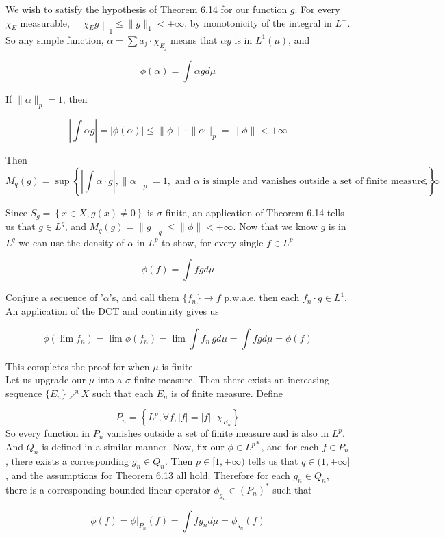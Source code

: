 \documentclass[../../main.tex]{subfiles}
\begin{document}
We wish to satisfy the hypothesis of Theorem 6.14 for our function $g$. For every $\chi_E$ measurable, $\left\lVert \chi_E g\right\rVert_1\leq \lVert g\rVert_1<+\infty$, by monotonicity of the integral in $L^+$. So any simple function, $\alpha = \sum a_j\cdot\chi_{E_j}$ means that $\alpha g$ is in $L^1(\mu)$, and

$$
\phi(\alpha) = \int \alpha g d\mu
$$

If $\lVert \alpha \rVert_p = 1$, then 

$$
\left|\int\alpha g\right| = \left|\phi(\alpha)\right| \leq \lVert \phi \rVert\cdot \lVert \alpha\rVert_p  = \lVert \phi \rVert < +\infty
$$

Then 
$$M_q(g) = \sup\left\{\left|\int \alpha\cdot g\right|, \lVert \alpha \rVert_p = 1, \text{ and $\alpha$ is simple and vanishes outside a set of finite measure.}\right\}<\infty$$

Since $S_g = \left\{x\in X, g(x) \neq 0\right\}$ is $\sigma$-finite, an application of Theorem 6.14 tells us that $g\in L^q$, and $M_q(g) = \lVert g \rVert_q\leq \lVert \phi \rVert<+\infty$. Now that we know $g$ is in $L^q$ we can use the density of $\alpha$ in $L^p$ to show, for every single $f\in L^p$

$$
\phi(f) = \int fg d\mu
$$

Conjure a sequence of '$\alpha$'s, and call them $\{f_n\} \to f$ p.w.a.e, then each $f_n\cdot g\in L^1$. An application of the DCT and continuity gives us

$$
\phi(\lim f_n) = \lim\phi(f_n) = \lim \int f_n\,gd\mu = \int fgd\mu=\phi(f)
$$

This completes the proof for when $\mu$ is finite.\\[2ex]

Let us upgrade our $\mu$ into a $\sigma$-finite measure. Then there exists an increasing sequence $\{E_n\}\nearrow X$ such that each $E_n$ is of finite measure. Define 

$$
P_n = \left\{L^p, \forall f, |f| = |f|\cdot\chi_{E_n}\right\}
$$
So every function in $P_n$ vanishes outside a set of finite measure and is also in $L^p$. And $Q_n$ is defined in a similar manner. Now, fix our $\phi\in L^{p*}$, and for each $f\in P_n$, there exists a corresponding $g_n\in Q_n$. Then $p\in[1,+\infty)$ tells us that $q\in ( 1,+\infty]$, and the assumptions for Theorem 6.13 all hold. Therefore for each $g_n\in Q_n$, there is a corresponding  bounded linear operator $\phi_{g_n} \in (P_n)^*$ such that 

$$
\phi(f) = \phi|_{P_n}(f) = \int fg_n d\mu = \phi_{g_n}(f)
$$
\end{document}
